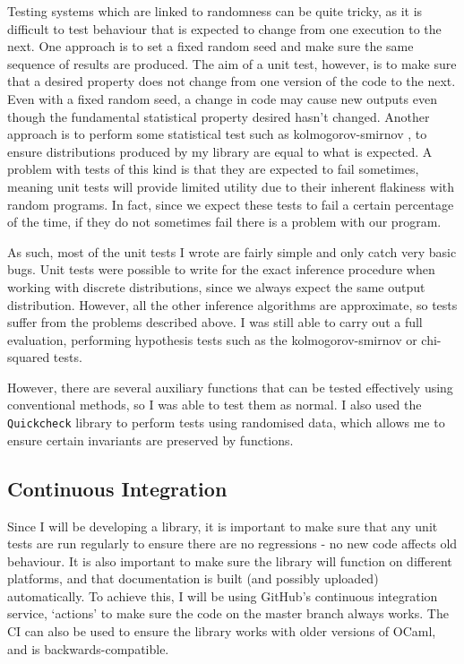Testing systems which are linked to randomness can be quite tricky, as it is difficult to test behaviour that is expected to change from one execution to the next. One approach is to set a fixed random seed and make sure the same sequence of results are produced. The aim of a unit test, however, is to make sure that a desired property does not change from one version of the code to the next. Even with a fixed random seed, a change in code may cause new outputs even though the fundamental statistical property desired hasn't changed. Another approach is to perform some statistical test such as kolmogorov-smirnov \cite{massey1951kolmogorov}, to ensure distributions produced by my library are equal to what is expected. A problem with tests of this kind is that they are expected to fail sometimes, meaning unit tests will provide limited utility due to their inherent flakiness with random programs. In fact, since we expect these tests to fail a certain percentage of the time, if they do not sometimes fail there is a problem with our program.

As such, most of the unit tests I wrote are fairly simple and only catch very basic bugs. Unit tests were possible to write for the exact inference procedure when working with discrete distributions, since we always expect the same output distribution. However, all the other inference algorithms are approximate, so tests suffer from the problems described above. I was still able to carry out a full evaluation, performing hypothesis tests such as the kolmogorov-smirnov or chi-squared tests.

However, there are several auxiliary functions that can be tested effectively using conventional methods, so I was able to test them as normal. I also used the \texttt{Quickcheck} library to perform tests using randomised data, which allows me to ensure certain invariants are preserved by functions.



\subsection{Continuous Integration}
Since I will be developing a library, it is important to make sure that any unit tests are run regularly to ensure there are no regressions - no new code affects old behaviour. It is also important to make sure the library will function on different platforms, and that documentation is built (and possibly uploaded) automatically. To achieve this, I will be using GitHub's continuous integration service, `actions' to make sure the code on the master branch always works. The CI can also be used to ensure the library works with older versions of OCaml, and is backwards-compatible.

